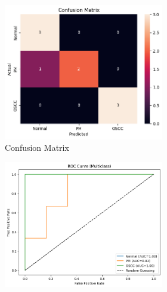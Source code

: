 \documentclass[a4paper,12pt]{article}
\begin{document}
\begin{figure}[H]
	\begin{subfigure}[b]{0.45\textwidth}
		\centering
		\begin{subfigure}[b]{0.49\textwidth}
			\centering
			\includegraphics[width=\textwidth]{images/3psl1c.png}  %
			\caption{Confusion Matrix}
			\label{fig:fig5}
		\end{subfigure}
		\hfill
		\begin{subfigure}[b]{0.49\textwidth}
			\centering
			\includegraphics[width=\textwidth]{images/3psl1r.png}  %

\end{subfigure}
\end{subfigure}
\end{figure}
\end{document}
